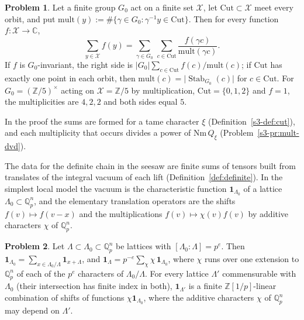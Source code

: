 \documentclass[reqno]{amsart}
\theoremstyle{definition}
\newtheorem{problem}{Problem}[section]
\theoremstyle{plain}
\newcommand{\Z}{\mathbb{Z}}
\newcommand{\Q}{\mathbb{Q}}
\newcommand{\C}{\mathbb{C}}
\newcommand{\Stab}{\operatorname{Stab}}
\begin{document}
\begin{problem}\label{pr:cut}
Let a finite group \(G_0\) act on a finite set \(\mathcal X\), let \(\mathrm{Cut} \subset \mathcal X\) meet every orbit, and put \(\mathrm{mult}(y) := \#\{\gamma \in G_0 : \gamma^{-1}y \in \mathrm{Cut}\}\).  Then for every function \(f \colon \mathcal X \to \C\),
\[
  \sum_{y \in \mathcal X} f(y) = \sum_{\gamma \in G_0}\, \sum_{c \in \mathrm{Cut}} \frac{f(\gamma c)}{\mathrm{mult}(\gamma c)} .
\]
If \(f\) is \(G_0\)-invariant, the right side is \(\lvert G_0\rvert \sum_{c \in \mathrm{Cut}} f(c)/\mathrm{mult}(c)\); if \(\mathrm{Cut}\) has exactly one point in each orbit, then \(\mathrm{mult}(c) = \lvert\Stab_{G_0}(c)\rvert\) for \(c \in \mathrm{Cut}\).  For \(G_0 = (\Z/5)^\times\) acting on \(\mathcal X = \Z/5\) by multiplication, \(\mathrm{Cut} = \{0,1,2\}\) and \(f = 1\), the multiplicities are \(4, 2, 2\) and both sides equal \(5\).
\end{problem}

In the proof the sums are formed for a tame character \(\xi\) (Definition~\ref{s3-def:cut}), and each multiplicity that occurs divides a power of \(\mathrm{Nm}\,Q_\xi\) (Problem~\ref{s3-pr:mult-dvd}).

The data for the definite chain in the seesaw are finite sums of tensors built from translates of the integral vacuum of each lift (Definition~\ref{def:definite}).  In the simplest local model the vacuum is the characteristic function \(\mathbf 1_{\Lambda_0}\) of a lattice \(\Lambda_0 \subset \Q_p^n\), and the elementary translation operators are the shifts \(f(v) \mapsto f(v-x)\) and the multiplications \(f(v) \mapsto \chi(v)f(v)\) by additive characters \(\chi\) of \(\Q_p^n\).

\begin{problem}\label{pr:lattice}
Let \(\Lambda \subset \Lambda_0 \subset \Q_p^n\) be lattices with \([\Lambda_0 : \Lambda] = p^e\).  Then \(\mathbf 1_{\Lambda_0} = \sum_{x \in \Lambda_0/\Lambda} \mathbf 1_{x + \Lambda}\), and \(\mathbf 1_\Lambda = p^{-e} \sum_{\chi} \chi\, \mathbf 1_{\Lambda_0}\), where \(\chi\) runs over one extension to \(\Q_p^n\) of each of the \(p^e\) characters of \(\Lambda_0/\Lambda\).  For every lattice \(\Lambda'\) commensurable with \(\Lambda_0\) (their intersection has finite index in both), \(\mathbf 1_{\Lambda'}\) is a finite \(\Z[1/p]\)-linear combination of shifts of functions \(\chi\mathbf 1_{\Lambda_0}\), where the additive characters \(\chi\) of \(\Q_p^n\) may depend on \(\Lambda'\).
\end{problem}
\end{document}
